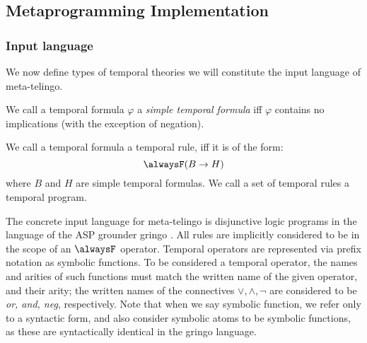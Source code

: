 \subsection{Metaprogramming Implementation}

\subsubsection{Input language}

We now define types of temporal theories we will constitute the input
language of meta-telingo.

\begin{definition}
  We call a temporal formula $\varphi$ a \emph{simple temporal
    formula} iff $\varphi$ contains no implications (with the
  exception of negation).
  
  We call a temporal formula a temporal rule, iff it is of the form:
  $$
  \alwaysF(B \rightarrow H)
  $$
  where $B$ and $H$ are simple temporal formulas. We call a set of
  temporal rules a temporal program.
\end{definition}

The concrete input language for meta-telingo is disjunctive logic
programs in the language of the ASP grounder gringo
\cite{PotasscoUserGuide19} \cite{gescth07a}. All rules are implicitly
considered to be in the scope of an $\alwaysF$ operator. Temporal
operators are represented via prefix notation as symbolic
functions. To be considered a temporal operator, the names and arities
of such functions must match the written name of the given operator,
and their arity; the written names of the connectives
$\vee, \wedge, \neg$ are considered to be \emph{or, and, neg},
respectively. Note that when we say symbolic function, we refer only
to a syntactic form, and also consider symbolic atoms to be symbolic
functions, as these are syntactically identical in the gringo
language.

